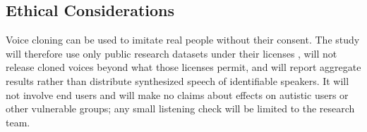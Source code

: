 \subsection{Ethical Considerations}
\label{sec:ethics}

Voice cloning can be used to imitate real people without their consent. The study will therefore use only public research datasets under their licenses \parencite{ardila2020commonvoice,panayotov2015librispeech}, will not release cloned voices beyond what those licenses permit, and will report aggregate results rather than distribute synthesized speech of identifiable speakers. It will not involve end users and will make no claims about effects on autistic users or other vulnerable groups; any small listening check will be limited to the research team.
